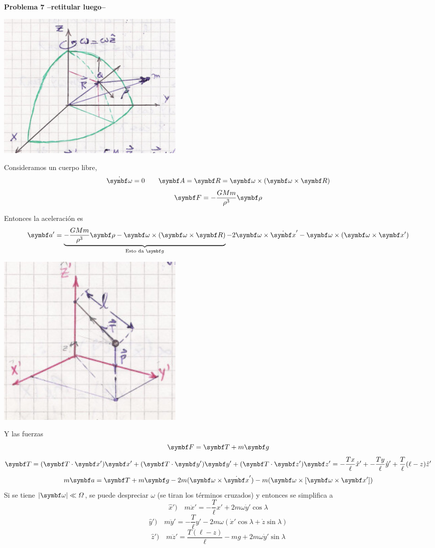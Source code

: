 \documentclass[10pt,oneside]{CBFT_book}
\begin{document}
\begin{ejemplo}{\bf Problema 7 --retitular luego--}

\includegraphics[width=0.4\textwidth]{images/fig_mc_rotantes_prob7_1.jpg}

Consideramos un cuerpo libre,
\[
	\dot{\vb{\omega}} = 0 \qquad \vb{A} = \vb{R} = \vb{\omega} \times ( \vb{\omega} \times \vb{R} )
\]
\[
	\vb{F}  = -\frac{GMm}{\rho^3}\vb{\rho}
\]

Entonces la aceleración es
\[
	\vb{a}'= \underbrace{ -\frac{GMm}{\rho^3}\vb{\rho} - \vb{\omega} \times ( \vb{\omega} \times \vb{R}) }_{\text{Esto da } 
	\vb{g} } - 2 \vb{\omega} \times \dot{\vb{x}}'- \vb{\omega} \times ( \vb{\omega} \times \vb{x}') 
\]

\includegraphics[width=0.4\textwidth]{images/fig_mc_rotantes_prob7_2.jpg}

Y las fuerzas
\[
	\vb{F} = \vb{T} + m \vb{g}
\]
\[
	\vb{T} = ( \vb{T}\cdot\vb{x}') \vb{x}' + ( \vb{T}\cdot\vb{y}') \vb{y}' + ( \vb{T}\cdot\vb{z}') \vb{z}' =
	-\frac{Tx}{\ell} \hat{x}' +  -\frac{Ty}{\ell} \hat{y}' + \frac{T}{\ell}(\ell-z) \hat{z}'
\]
\[
	m \vb{a}  = \vb{T} + m \vb{g} - 2 m ( \vb{\omega} \times  \dot{\vb{x}}') -
	m ( \vb{\omega} \times [ \vb{\omega} \times \vb{x}'] )
\]
Si se tiene $|\vb{\omega}| \ll \Omega $, se puede despreciar $\omega$ (se tiran los términos cruzados) y entonces se simplifica a
\[
	\hat{x}' ) \quad m \ddot{x}' = - \frac{T}{\ell} x' + 2 m \omega \dot{y}' \cos \lambda
\]
\[
	\hat{y}' ) \quad m \ddot{y}' = - \frac{T}{\ell} y' - 
	2 m \omega \left( \dot{x}' \cos \lambda + \dot{z} \sin \lambda \right)
\]
\[
	\hat{z}' ) \quad m \ddot{z}' = \frac{T(\ell -z)}{\ell} - m g + 2 m \omega \dot{y}' \sin \lambda
\]


\end{ejemplo}
\end{document}
